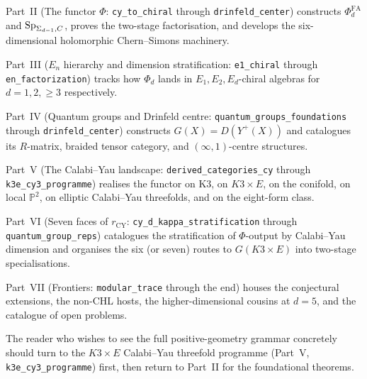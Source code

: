 Part~II (The functor $\Phi$: \texttt{cy\_to\_chiral} through
\texttt{drinfeld\_center}) constructs $\Phi^{\mathrm{FA}}_d$
and $\mathrm{Sp}_{\Sigma_{d-1}, C}$, proves the two-stage factorisation,
and develops the six-dimensional holomorphic Chern--Simons
machinery.

Part~III ($E_n$ hierarchy and dimension stratification:
\texttt{e1\_chiral} through \texttt{en\_factorization})
tracks how $\Phi_d$ lands in $E_1, E_2, E_d$-chiral algebras for
$d = 1, 2, \geq 3$ respectively.

Part~IV (Quantum groups and Drinfeld centre:
\texttt{quantum\_groups\_foundations} through
\texttt{drinfeld\_center}) constructs $G(X) = D(Y^+(X))$ and
catalogues its $R$-matrix, braided tensor category, and
$(\infty, 1)$-centre structures.

Part~V (The Calabi--Yau landscape:
\texttt{derived\_categories\_cy} through
\texttt{k3e\_cy3\_programme}) realises the functor on K3, on
$K3 \times E$, on the conifold, on local $\mathbb{P}^2$, on elliptic
Calabi--Yau threefolds, and on the eight-form class.

Part~VI (Seven faces of $r_{\mathrm{CY}}$:
\texttt{cy\_d\_kappa\_stratification} through
\texttt{quantum\_group\_reps}) catalogues the stratification of
$\Phi$-output by Calabi--Yau dimension and organises the six (or
seven) routes to $G(K3 \times E)$ into two-stage specialisations.

Part~VII (Frontiers: \texttt{modular\_trace} through the end)
houses the conjectural extensions, the non-CHL hosts, the
higher-dimensional cousins at $d = 5$, and the catalogue of open
problems.

The reader who wishes to see the full positive-geometry grammar
concretely should turn to the $K3 \times E$ Calabi--Yau threefold
programme (Part~V, \texttt{k3e\_cy3\_programme}) first, then
return to Part~II for the foundational theorems.
